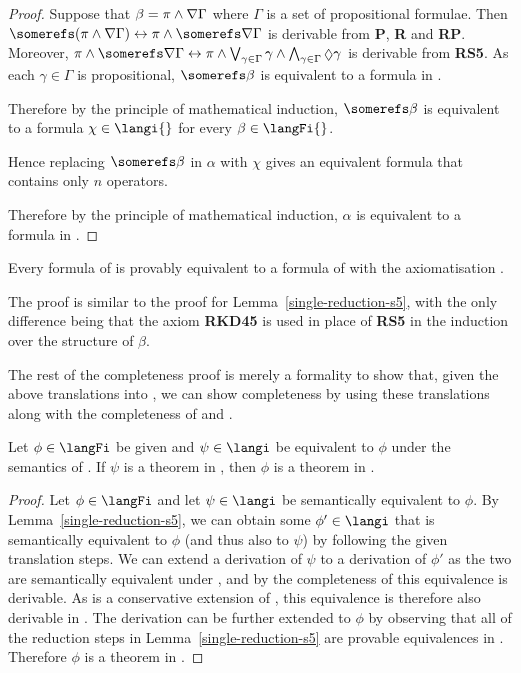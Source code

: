 \begin{proof}
Suppose that $\beta = \pi \land \nabla \Gamma$ where $\Gamma$ is a set of
propositional formulae. Then $\somerefs (\pi \land \covers \Gamma) \iff
\pi \land \somerefs \covers \Gamma$ is derivable from {\bf P}, {\bf R} and {\bf
RP}. Moreover, $\pi \land \somerefs \covers \Gamma \iff \pi \land
\bigvee_{\gamma \in \Gamma} \gamma \land \bigwedge_{\gamma \in \Gamma} \suspects
\gamma$ is derivable from {\bf RS5}. As each $\gamma \in \Gamma$ is
propositional, $\somerefs \beta$ is equivalent to a formula in \langi{}.

Therefore by the principle of mathematical induction, $\somerefs \beta$ is
equivalent to a formula $\chi \in \langi{}$ for every $\beta \in \langFi{}$.

Hence replacing $\somerefs \beta$ in $\alpha$ with $\chi$ gives an equivalent
formula that contains only $n$ \somerefs{} operators.

Therefore by the principle of mathematical induction, $\alpha$ is equivalent to
a formula in \langi{}.
\end{proof}

\begin{lemma}\label{single-reduction-kd45}
Every formula of \langFi{} is provably equivalent to a formula of \langi{} with
the axiomatisation \axiomKDiF{}.
\end{lemma}

The proof is similar to the proof for Lemma~\ref{single-reduction-s5}, with the
only difference being that the axiom {\bf RKD45} is used in place of {\bf RS5}
in the induction over the structure of $\beta$.

The rest of the completeness proof is merely a formality to show that, given the
above translations into \langi{}, we can show completeness by using these
translations along with the completeness of \logicSi{} and \logicKDi{}.

\begin{corollary}\label{single-derivable-s5}
Let $\phi \in \langFi$ be given and $\psi \in \langi$ be equivalent to $\phi$
under the semantics of \logicSiF{}.  If $\psi$ is a theorem in \logicSi{}, then
$\phi$ is a theorem in \axiomSiF{}.
\end{corollary}

\begin{proof}
Let $\phi \in \langFi$ and let $\psi \in \langi$ be semantically equivalent to
$\phi$. By Lemma~\ref{single-reduction-s5}, we can obtain some $\phi' \in \langi$
that is semantically equivalent to $\phi$ (and thus also to $\psi$) by following
the given translation steps. We can extend a derivation of $\psi$ to a
derivation of $\phi'$ as the two are semantically equivalent under \logicSi{}, and by
the completeness of \logicSi{} this equivalence is derivable. As \axiomSiF{} is a
conservative extension of \logicSi{}, this equivalence is therefore also derivable
in \axiomSiF{}. The derivation can be further extended to $\phi$ by observing that all
of the reduction steps in Lemma~\ref{single-reduction-s5} are provable equivalences
in \axiomSiF{}. Therefore $\phi$ is a theorem in \axiomSiF{}.
\end{proof}

